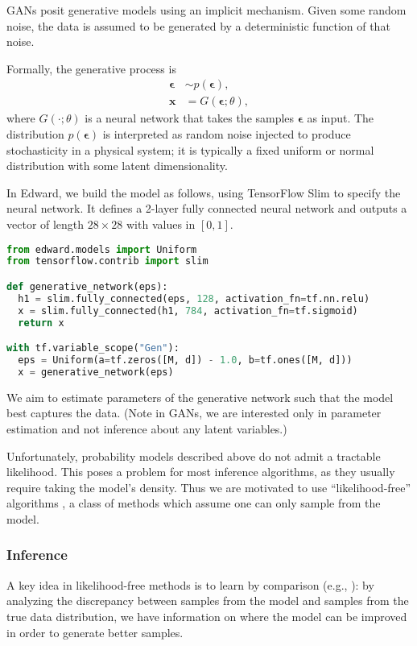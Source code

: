 GANs posit generative models using an implicit mechanism. Given some
random noise, the data is assumed to be generated by a deterministic
function of that noise.

Formally, the generative process is
\begin{align*}
\mathbf{\epsilon} &\sim p(\mathbf{\epsilon}), \\
\mathbf{x} &= G(\mathbf{\epsilon}; \theta),
\end{align*}
where $G(\cdot; \theta)$ is a neural network that takes the samples
$\mathbf{\epsilon}$ as input. The distribution
$p(\mathbf{\epsilon})$ is interpreted as random noise injected to
produce stochasticity in a physical system; it is typically a fixed
uniform or normal distribution with some latent dimensionality.

In Edward, we build the model as follows, using TensorFlow Slim to
specify the neural network. It defines a 2-layer fully connected neural
network and outputs a vector of length $28\times28$ with values in
$[0,1]$.

\begin{lstlisting}[language=Python]
from edward.models import Uniform
from tensorflow.contrib import slim

def generative_network(eps):
  h1 = slim.fully_connected(eps, 128, activation_fn=tf.nn.relu)
  x = slim.fully_connected(h1, 784, activation_fn=tf.sigmoid)
  return x

with tf.variable_scope("Gen"):
  eps = Uniform(a=tf.zeros([M, d]) - 1.0, b=tf.ones([M, d]))
  x = generative_network(eps)
\end{lstlisting}

We aim to estimate parameters of the generative network such
that the model best captures the data. (Note in GANs, we are
interested only in parameter estimation and not inference about any
latent variables.)

Unfortunately, probability models described above do not admit a tractable
likelihood. This poses a problem for most inference algorithms, as
they usually require taking the model's density.  Thus we are
motivated to use ``likelihood-free'' algorithms
\citep{marin2012approximate}, a class of methods which assume one
can only sample from the model.

\subsubsection{Inference}

A key idea in likelihood-free methods is to learn by
comparison (e.g., \citet{rubin1984bayesianly,gretton2012kernel}): by
analyzing the discrepancy between samples from the model and samples
from the true data distribution, we have information on where the
model can be improved in order to generate better samples.


